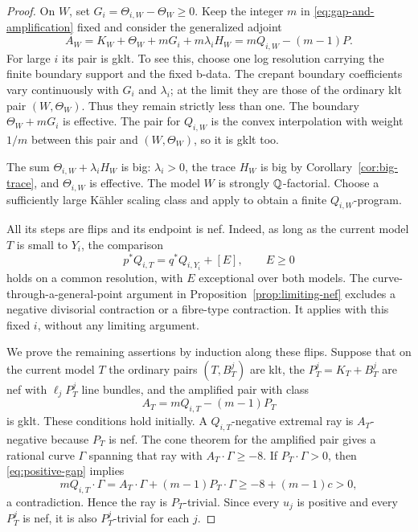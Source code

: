 \begin{proof}
On $W$, set $G_i=\Theta_{i,W}-\Theta_W\ge0$.  Keep the integer $m$ in
\eqref{eq:gap-and-amplification} fixed and consider the generalized
adjoint
\begin{equation}
 A_W=K_W+\Theta_W+mG_i+m\lambda_iH_W
     =mQ_{i,W}-(m-1)P .
 \label{eq:amplified-adjoint}
\end{equation}
For large $i$ its pair is gklt.  To see this, choose one log resolution
carrying the finite boundary support and the fixed b-data.  The
crepant boundary coefficients vary continuously with $G_i$ and
$\lambda_i$; at the limit they are those of the ordinary klt pair
$(W,\Theta_W)$.  Thus they remain strictly less than one.
The boundary $\Theta_W+mG_i$ is effective.  The pair for $Q_{i,W}$
is the convex interpolation with weight $1/m$ between this pair and
$(W,\Theta_W)$, so it is gklt too.

The sum $\Theta_{i,W}+\lambda_iH_W$ is big:
$\lambda_i>0$, the trace $H_W$ is big by Corollary~\ref{cor:big-trace},
and $\Theta_{i,W}$ is effective.  The model $W$ is strongly
$\mathbb Q$-factorial.  Choose a sufficiently large Kähler scaling class and
apply \cite[Theorem~1.5]{HX2026} to obtain a finite $Q_{i,W}$-program.

All its steps are flips and its endpoint is nef.  Indeed, as long as
the current model $T$ is small to $Y_i$, the comparison
\[
 p^*Q_{i,T}=q^*Q_{i,Y_i}+[E],\qquad E\ge0
\]
holds on a common resolution, with $E$ exceptional over both models.
The curve-through-a-general-point argument in
Proposition~\ref{prop:limiting-nef} excludes a negative divisorial
contraction or a fibre-type contraction.  It applies with this fixed
$i$, without any limiting argument.

We prove the remaining assertions by induction along these flips.
Suppose that on the current model $T$ the ordinary pairs
$(T,B^j_T)$ are klt, the $P^j_T=K_T+B^j_T$ are nef with
$\ell_jP^j_T$ line bundles, and the amplified pair with class
\[
 A_T=mQ_{i,T}-(m-1)P_T
\]
is gklt.  These conditions hold initially.  A $Q_{i,T}$-negative
extremal ray is $A_T$-negative because $P_T$ is nef.  The cone theorem
for the amplified pair gives a rational curve $\Gamma$ spanning that
ray with $A_T\cdot\Gamma\ge-8$.  If $P_T\cdot\Gamma>0$, then
\eqref{eq:positive-gap} implies
\[
 mQ_{i,T}\cdot\Gamma
   =A_T\cdot\Gamma+(m-1)P_T\cdot\Gamma
   \ge-8+(m-1)c>0,
\]
a contradiction.  Hence the ray is $P_T$-trivial.  Since every $u_j$
is positive and every $P^j_T$ is nef, it is also $P^j_T$-trivial for
each $j$.


\end{proof}
